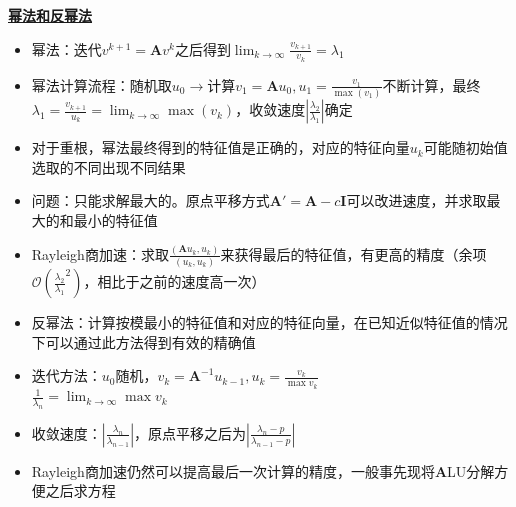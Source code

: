 \documentclass[UTF8,a4paper,landscape,8pt]{paper}
\renewcommand{\subsection}[1]{{\small\textbf{\underline{#1}}}\\ }
\newcommand{\List}[1]{\begin{itemize}[fullwidth,itemindent=0em] #1 \end{itemize}}
\begin{document}
\begin{multicols}{4}
    \subsection{幂法和反幂法}
    \List{
        \item {幂法：迭代$v^{k+1} = \bm Av^k$之后得到$\lim_{k\to\infty}\frac{v_{k+1}}{v_k} = \lambda_1$}
        \item {幂法计算流程：随机取$u_0\rightarrow$计算$v_1 = \bm Au_0,u_1 = \frac{v_1}{\max(v_1)}$不断计算，最终$\lambda_1 = \frac{v_{k+1}}{u_k} = \lim_{k\to\infty}\max(v_k)$，收敛速度$|\frac{\lambda_2}{\lambda_1}|$确定}
        \item {对于重根，幂法最终得到的特征值是正确的，对应的特征向量$u_k$可能随初始值选取的不同出现不同结果}
        \item {问题：只能求解最大的。原点平移方式$\bm A' = \bm A - c\bm I$可以改进速度，并求取最大的和最小的特征值}
        \item {Rayleigh商加速：求取$\frac{(\bm Au_k,u_k)}{(u_k,u_k)}$来获得最后的特征值，有更高的精度（余项$\mathcal O(\frac {\lambda_2}{\lambda_1}^2)$，相比于之前的速度高一次）}
        \item {反幂法：计算按模最小的特征值和对应的特征向量，在已知近似特征值的情况下可以通过此方法得到有效的精确值}
        \item {迭代方法：$u_0$随机，$v_k = \bm A^{-1}u_{k-1},u_k = \frac{v_k}{\max v_k}$\\ $\frac 1{\lambda_n} = \lim_{k\to\infty}\max v_k$}
        \item {收敛速度：$|\frac{\lambda_n}{\lambda_{n-1}}|$，原点平移之后为$|\frac{\lambda_n - p}{\lambda_{n-1} - p}|$}
        \item {Rayleigh商加速仍然可以提高最后一次计算的精度，一般事先现将$\bm A$LU分解方便之后求方程}
        }

\end{multicols}
\end{document}
